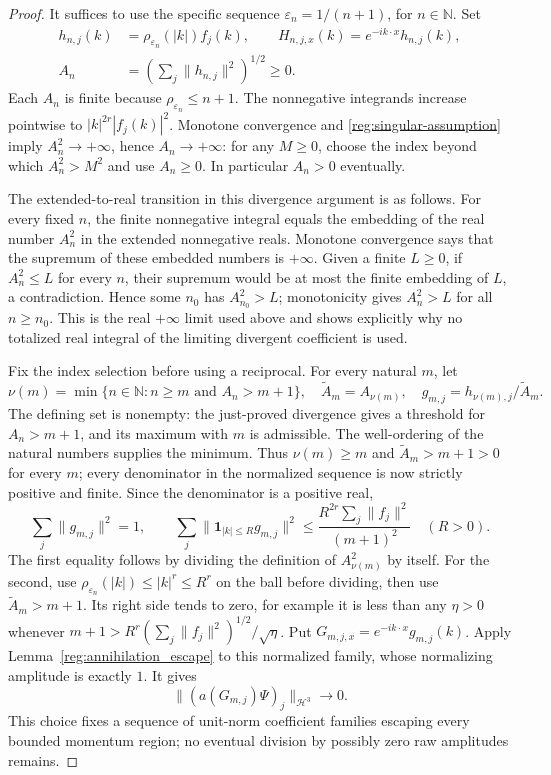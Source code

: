 \documentclass[11pt,a4paper]{article}
\theoremstyle{definition}
\theoremstyle{remark}
\begin{document}
\begin{proof}
It suffices to use the specific sequence
\(\varepsilon_n=1/(n+1)\), for \(n\in\mathbb N\). Set
\begin{align*}
 h_{n,j}(k)&=\rho_{\varepsilon_n}(|k|)f_j(k),\qquad
 H_{n,j,x}(k)=e^{-ik\cdot x}h_{n,j}(k),\\
 A_n&=\left(\sum_j\|h_{n,j}\|^2\right)^{1/2}\geq0.
\end{align*}
Each \(A_n\) is finite because
\(\rho_{\varepsilon_n}\leq n+1\). The nonnegative integrands increase
pointwise to \(|k|^{2r}|f_j(k)|^2\). Monotone convergence and
\eqref{reg:singular-assumption} imply
\(A_n^2\to+\infty\), hence \(A_n\to+\infty\): for any
\(M\geq0\), choose the index beyond which \(A_n^2>M^2\) and
use \(A_n\geq0\). In particular \(A_n>0\) eventually.

The extended-to-real transition in this divergence argument is as
follows. For every fixed $n$, the finite nonnegative integral equals
the embedding of the real number $A_n^2$ in the extended
nonnegative reals. Monotone convergence says that the supremum of
these embedded numbers is $+\infty$. Given a finite $L\geq0$,
if $A_n^2\leq L$ for every $n$, their supremum would be at most
the finite embedding of $L$, a contradiction. Hence some $n_0$
has $A_{n_0}^2>L$; monotonicity gives $A_n^2>L$ for all
$n\geq n_0$. This is the real $+\infty$ limit used above and
shows explicitly why no totalized real integral of the limiting
divergent coefficient is used.

Fix the index selection before using a reciprocal. For every natural
$m$, let
\[
 \nu(m)=\min\{n\in\mathbb N:n\geq m\text{ and }A_n>m+1\},
 \quad \widetilde A_m=A_{\nu(m)},\quad
 g_{m,j}=h_{\nu(m),j}/\widetilde A_m.
\]
The defining set is nonempty: the just-proved divergence gives a
threshold for $A_n>m+1$, and its maximum with $m$ is admissible.
The well-ordering of the natural numbers supplies the minimum.
Thus $\nu(m)\geq m$ and $\widetilde A_m>m+1>0$ for every
$m$; every denominator in the normalized sequence is now strictly
positive and finite. Since the denominator is a positive real,
\[
 \sum_j\|g_{m,j}\|^2=1,\qquad
 \sum_j\|\mathbf1_{|k|\leq R}g_{m,j}\|^2
 \leq\frac{R^{2r}\sum_j\|f_j\|^2}{(m+1)^2}
       \quad(R>0).
\]
The first equality follows by dividing the definition of
$A_{\nu(m)}^2$ by itself. For the second, use
$\rho_{\varepsilon_n}(|k|)\leq|k|^r\leq R^r$ on the ball
before dividing, then use $\widetilde A_m>m+1$. Its right
side tends to zero, for example it is less than any $\eta>0$
whenever $m+1>R^r(\sum_j\|f_j\|^2)^{1/2}/\sqrt\eta$.
Put $G_{m,j,x}=e^{-ik\cdot x}g_{m,j}(k)$. Apply
Lemma~\ref{reg:annihilation_escape} to this normalized family,
whose normalizing amplitude is exactly $1$. It gives
\begin{equation}
 \|(a(G_{m,j})\Psi)_j\|_{\mathcal H^3}\longrightarrow0.
 \label{reg:small-annihilation}
\end{equation}
This choice fixes a sequence of unit-norm coefficient families
escaping every bounded momentum region; no eventual division by
possibly zero raw amplitudes remains.


\end{proof}
\end{document}
